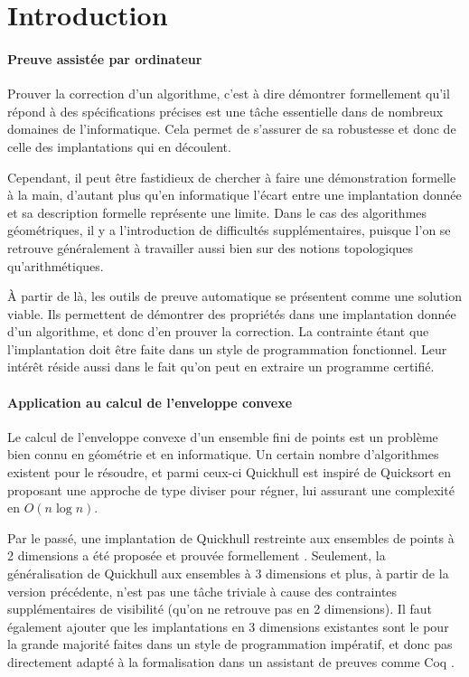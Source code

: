 \documentclass[]{article}
\begin{document}
\newpage

\newpage
\tableofcontents
\newpage

\section{Introduction}
\paragraph{Preuve assistée par ordinateur}
Prouver la correction d'un algorithme, c'est à dire démontrer formellement qu'il répond à des spécifications précises est une tâche essentielle dans de nombreux domaines de l'informatique. Cela permet de s'assurer de sa robustesse et donc de celle des implantations qui en découlent.

Cependant, il peut être fastidieux de chercher à faire une démonstration formelle à la main, d'autant plus qu'en informatique l'écart entre une implantation donnée et sa description formelle représente une limite. Dans le cas des algorithmes géométriques, il y a l'introduction de difficultés supplémentaires, puisque l'on se retrouve généralement à travailler aussi bien sur des notions topologiques qu'arithmétiques.

À partir de là, les outils de preuve automatique se présentent comme une solution viable. Ils permettent de démontrer des propriétés dans une implantation donnée d'un algorithme, et donc d'en prouver la correction. La contrainte étant que l'implantation doit être faite dans un style de programmation fonctionnel. Leur intérêt réside aussi dans le fait qu'on peut en extraire un programme certifié.

\paragraph{Application au calcul de l'enveloppe convexe}
Le calcul de l'enveloppe convexe d'un ensemble fini de points est un problème bien connu en géométrie et en informatique. Un certain nombre d'algorithmes existent pour le résoudre, et parmi ceux-ci Quickhull est inspiré de Quicksort en proposant une approche de type diviser pour régner, lui assurant une complexité en $O(n\log{}n)$.

Par le passé, une implantation de Quickhull restreinte aux ensembles de points à 2 dimensions a été proposée et prouvée formellement \cite{brun:hal-00955400, brun:hal-00916880}. Seulement, la généralisation de Quickhull aux ensembles à 3 dimensions et plus, à partir de la version précédente, n'est pas une tâche triviale à cause des contraintes supplémentaires de visibilité (qu'on ne retrouve pas en 2 dimensions). Il faut également ajouter que les implantations en 3 dimensions existantes sont le pour la grande majorité faites dans un style de programmation impératif, et donc pas directement adapté à la formalisation dans un assistant de preuves comme Coq \cite{coqref}.
\end{document}
